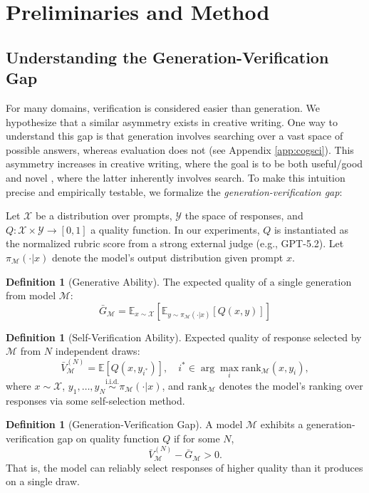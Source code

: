 \documentclass{article}
\theoremstyle{plain}
\theoremstyle{definition}
\newtheorem{definition}[theorem]{Definition}
\theoremstyle{remark}
\begin{document}
\section{Preliminaries and Method}
\label{sec:gv_gap}
\subsection{Understanding the Generation-Verification Gap}
For many domains, verification is considered easier than generation. We hypothesize that a similar asymmetry exists in creative writing. One way to understand this gap is that generation involves searching over a vast space of possible answers, whereas evaluation does not (see Appendix \ref{app:cogsci}). This asymmetry increases in creative writing, where the goal is to be both useful/good and novel \citep{schmidhuber2010formal}, where the latter inherently involves search. To make this intuition precise and empirically testable, we formalize the \textit{generation-verification gap}:

Let $\mathcal{X}$ be a distribution over prompts, $\mathcal{Y}$ the space of responses, and $Q: \mathcal{X} \times \mathcal{Y} \to [0, 1]$ a quality function. In our experiments, $Q$ is instantiated as the normalized rubric score from a strong external judge (e.g., GPT-5.2). Let $\pi_\mathcal{M}(\cdot|x)$ denote the model's output distribution given prompt $x$.

\begin{definition}[Generative Ability]
The expected quality of a single generation from model $\mathcal{M}$:
\[\bar{G}_\mathcal{M} = \mathbb{E}_{x \sim \mathcal{X}}\left[\mathbb{E}_{y \sim \pi_\mathcal{M}(\cdot|x)}\left[Q(x, y)\right]\right]\]
\end{definition}

\begin{definition}[Self-Verification Ability]
Expected quality of response selected by $\mathcal{M}$ from $N$ independent draws:
\[\bar{V}_\mathcal{M}^{(N)} = \mathbb{E}[Q(x,y_{i^*})], \quad i^* \in \arg\max_{i} \mathrm{rank}_\mathcal{M}(x, y_i),\]
where $x \sim \mathcal{X}$, $y_1, \ldots, y_N \overset{\text{i.i.d.}}{\sim} \pi_\mathcal{M}(\cdot|x)$, and $\mathrm{rank}_\mathcal{M}$ denotes the model's ranking over responses via some self-selection method.
\end{definition}

\begin{definition}[Generation-Verification Gap]
A model $\mathcal{M}$ exhibits a generation-verification gap on quality function $Q$ if for some $N$,
\[\bar{V}_\mathcal{M}^{(N)} - \bar{G}_\mathcal{M} > 0.\]
That is, the model can reliably select responses of higher quality than it produces on a single draw.
\end{definition}
\end{document}
